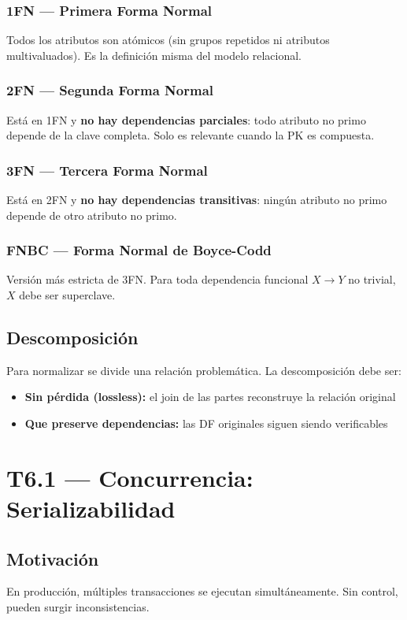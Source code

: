 \documentclass[12pt, a4paper]{article}
\begin{document}
\subsubsection{1FN — Primera Forma Normal}
Todos los atributos son atómicos (sin grupos repetidos ni atributos multivaluados). Es la definición misma del modelo relacional.

\subsubsection{2FN — Segunda Forma Normal}
Está en 1FN y \textbf{no hay dependencias parciales}: todo atributo no primo depende de la clave completa. Solo es relevante cuando la PK es compuesta.

\subsubsection{3FN — Tercera Forma Normal}
Está en 2FN y \textbf{no hay dependencias transitivas}: ningún atributo no primo depende de otro atributo no primo.

\subsubsection{FNBC — Forma Normal de Boyce-Codd}
Versión más estricta de 3FN. Para toda dependencia funcional $X \rightarrow Y$ no trivial, $X$ debe ser superclave.

\subsection{Descomposición}
Para normalizar se divide una relación problemática. La descomposición debe ser:
\begin{itemize}
  \item \textbf{Sin pérdida (lossless):} el join de las partes reconstruye la relación original
  \item \textbf{Que preserve dependencias:} las DF originales siguen siendo verificables
\end{itemize}

\section{T6.1 — Concurrencia: Serializabilidad}

\subsection{Motivación}
En producción, múltiples transacciones se ejecutan simultáneamente. Sin control, pueden surgir inconsistencias.
\end{document}
